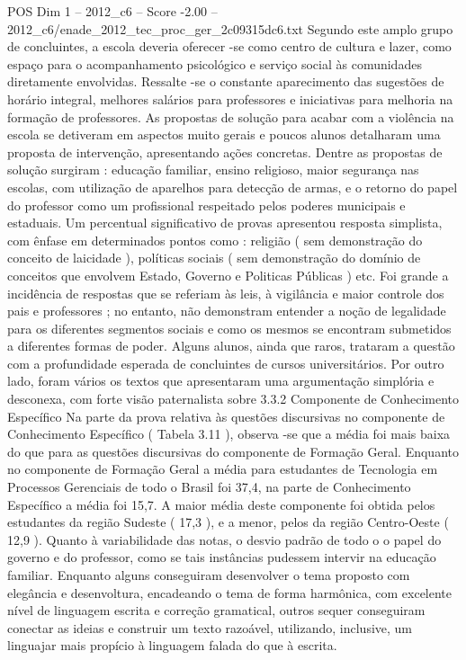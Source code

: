 \begin{textsample}{POS Dim 1 – 2012\_c6 – Score -2.00 – 2012\_c6/enade\_2012\_tec\_proc\_ger\_2c09315dc6.txt}
Segundo este amplo grupo de concluintes, a escola deveria oferecer -se como centro de cultura e lazer, como espaço para o acompanhamento psicológico e serviço social às comunidades diretamente envolvidas.
Ressalte -se o constante aparecimento das sugestões de horário integral, melhores salários para professores e iniciativas para melhoria na formação de professores.
As propostas de solução para acabar com a violência na escola se detiveram em aspectos muito gerais e poucos alunos detalharam uma proposta de intervenção, apresentando ações concretas.
Dentre as propostas de solução surgiram : educação familiar, ensino religioso, maior segurança nas escolas, com utilização de aparelhos para detecção de armas, e o retorno do papel do professor como um profissional respeitado pelos poderes municipais e estaduais.
Um percentual significativo de provas apresentou resposta simplista, com ênfase em determinados pontos como : religião ( sem demonstração do conceito de laicidade ), políticas sociais ( sem demonstração do domínio de conceitos que envolvem Estado, Governo e Politicas Públicas ) etc.
Foi grande a incidência de respostas que se referiam às leis, à vigilância e maior controle dos pais e professores ; no entanto, não demonstram entender a noção de legalidade para os diferentes segmentos sociais e como os mesmos se encontram submetidos a diferentes formas de poder.
Alguns alunos, ainda que raros, trataram a questão com a profundidade esperada de concluintes de cursos universitários.
Por outro lado, foram vários os textos que apresentaram uma argumentação simplória e desconexa, com forte visão paternalista sobre 3.3.2 Componente de Conhecimento Específico Na parte da prova relativa às questões discursivas no componente de Conhecimento Específico ( Tabela 3.11 ), observa -se que a média foi mais baixa do que para as questões discursivas do componente de Formação Geral.
Enquanto no componente de Formação Geral a média para estudantes de Tecnologia em Processos Gerenciais de todo o Brasil foi 37,4, na parte de Conhecimento Específico a média foi 15,7.
A maior média deste componente foi obtida pelos estudantes da região Sudeste ( 17,3 ), e a menor, pelos da região Centro-Oeste ( 12,9 ).
Quanto à variabilidade das notas, o desvio padrão de todo o o papel do governo e do professor, como se tais instâncias pudessem intervir na educação familiar.
Enquanto alguns conseguiram desenvolver o tema proposto com elegância e desenvoltura, encadeando o tema de forma harmônica, com excelente nível de linguagem escrita e correção gramatical, outros sequer conseguiram conectar as ideias e construir um texto razoável, utilizando, inclusive, um linguajar mais propício à linguagem falada do que à escrita.

\end{textsample}

